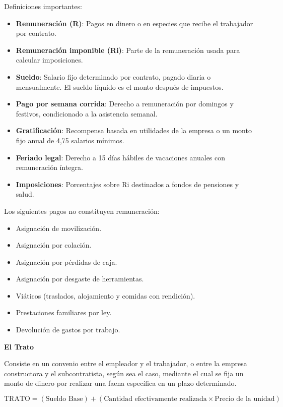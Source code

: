 Definiciones importantes:

\begin{itemize}
    \item \textbf{Remuneración (R)}: Pagos en dinero o en especies que recibe el trabajador por contrato.
    \item \textbf{Remuneración imponible (Ri)}: Parte de la remuneración usada para calcular imposiciones.
    \item \textbf{Sueldo}: Salario fijo determinado por contrato, pagado diaria o mensualmente. El sueldo líquido es el monto después de impuestos.
    \item \textbf{Pago por semana corrida}: Derecho a remuneración por domingos y festivos, condicionado a la asistencia semanal.
    \item \textbf{Gratificación}: Recompensa basada en utilidades de la empresa o un monto fijo anual de 4,75 salarios mínimos.
    \item \textbf{Feriado legal}: Derecho a 15 días hábiles de vacaciones anuales con remuneración íntegra.
    \item \textbf{Imposiciones}: Porcentajes sobre Ri destinados a fondos de pensiones y salud.
\end{itemize}

\noindent Los siguientes pagos no constituyen remuneración:
\begin{itemize}
    \item Asignación de movilización.
    \item Asignación por colación.
    \item Asignación por pérdidas de caja.
    \item Asignación por desgaste de herramientas.
    \item Viáticos (traslados, alojamiento y comidas con rendición).
    \item Prestaciones familiares por ley.
    \item Devolución de gastos por trabajo.
\end{itemize}

\textbf{El Trato}

Consiste en un convenio entre el empleador y el trabajador, o entre la empresa constructora y el subcontratista, según sea el caso, mediante el cual se fija un monto de dinero por realizar una faena específica en un plazo determinado.

\begin{equation}
    \text{TRATO} = (\text{Sueldo Base}) + (\text{Cantidad efectivamente realizada} \times \text{Precio de la unidad})
\end{equation}

